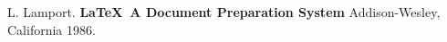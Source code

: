 \documentclass[12pt,leqno]{book}
\begin{document}




\pagestyle{headings}




\begin{thebibliography}{99}
 L. Lamport. {\bf \LaTeX \ A Document Preparation System}
Addison-Wesley, California 1986.
\end{thebibliography}
\listoffigures
\listoftables

\end{document}
